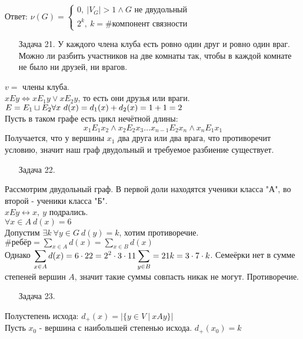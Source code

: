 \documentclass[12pt, letterpaper, twoside]{article}
\begin{document}
    Ответ: $\nu (G) = \begin{cases}
        0,\ |V_G|>1\wedge G\text{ не двудольный}\\
        2^k,\ k =\#\text{компонент связности}
    \end{cases}$  
    \begin{enumerate}
        \item[Задача 21.] У каждого члена клуба есть ровно один друг и ровно один враг. Можно ли разбить участников на две комнаты так, чтобы в каждой комнате не было ни друзей, ни врагов.
    \end{enumerate}
    $v =$ члены клуба.\\
    $xEy \Leftrightarrow xE_1y\vee xE_2y$, то есть они друзья или враги.\\
    $E = E_1 \sqcup E_2\\
    \forall x\ d(x) = d_1(x) + d_2(x) = 1 + 1 = 2$\\
    Пусть в таком графе есть цикл нечётной длины:
    \[x_1E_1x_2\wedge x_2E_2x_3\dots x_{n - 1}E_2x_{n} \wedge x_nE_1x_1\]
    Получается, что у вершины $x_1$ два друга или два врага, что противоречит условию, значит наш граф двудольный и требуемое разбиение существует.
    \begin{enumerate}
        \item[Задача 22.]
    \end{enumerate}
    Рассмотрим двудольный граф. В первой доли находятся ученики класса "А", во второй - ученики класса "Б".\\
    $xEy\leftrightarrow x,\ y$ подрались.\\
    $\forall x\in A\ d(x) = 6$\\
    Допустим $\exists k\ \forall y\in G\ d(y) = k$, хотим противоречие.\\
    $\#\text{ребёр} = \displaystyle \sum_{x\in A}d(x) = \sum_{x\in B}d(x)$\\
    Однако $\displaystyle \sum_{x\in A}d(x) = 6\cdot 22 = 2^2\cdot 3\cdot 11\\
    \sum_{y\in B} = 21k = 3\cdot 7\cdot k$. Семеёрки нет в сумме степеней вершин $A$, значит такие суммы совпасть никак не могут. Противоречие.
    \begin{enumerate}
        \item[Задача 23.]
    \end{enumerate}
    Полустепень исхода: $d_+(x) = \Big| \{y\in V\ |\ xAy\} \Big|$\\
    Пусть $x_0$ - вершина с наибольшей степенью исхода. $d_+(x_0) = k$\\
\end{document}
